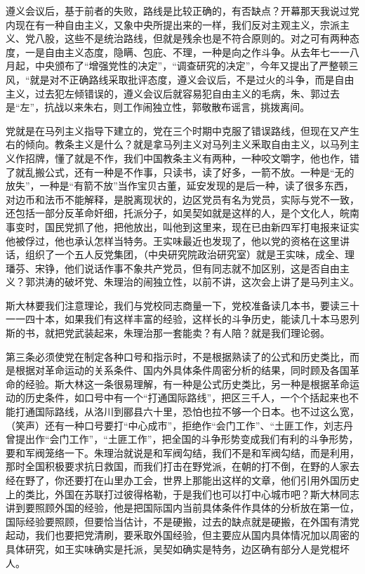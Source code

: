 遵义会议后，基于前者的失败，路线是比较正确的，有否缺点？开幕那天我说过党内现在有一种自由主义，又象中央所提出来的一样，我们反对主观主义，宗派主义、党八股，这些不是统治路线，但就是残余也是不符合原则的。对之可有两种态度，一是自由主义态度，隐瞒、包庇、不理，一种是向之作斗争。从去年七一一八月起，中央颁布了“增强党性的决定”，“调查研究的决定”，今年又提出了严整顿三风，“就是对不正确路线采取批评态度，遵义会议后，不是过火的斗争，而是自由主义，过去犯左倾错误的，遵义会议后就容易犯自由主义的毛病，朱、郭过去是“左”，抗战以来朱右，则工作闹独立性，郭敬散布谣言，挑拨离间。

党就是在马列主义指导下建立的，党在三个时期中克服了错误路线，但现在又产生右的倾向。教条主义是什么？就是拿马列主义对马列主义釆取自由主义，以马列主义作招牌，懂了就是不作，我们中国教条主义有两种，一种咬文嚼字，他也作，错了就乱搬公式，还有一种是不作事，只读书，读了好多，一箭不放。一种是“无的放失”，一种是“有箭不放”当作宝贝古董，延安发现的是后一种，读了很多东西，对边币和法币不能解释，是脱离现状的，边区党员有名为党员，实际与党不一致，还包括一部分反革命奸细，托派分子，如吴契如就是这样的人，是个文化人，皖南事变时，国民党抓了他，把他放出，叫他到这里来，现在已由新四军打电报来证实他被俘过，他也承认怎样当特务。王实味最近也发现了，他以党的资格在这里讲话，组织了一个五人反党集团，（中央研究院政治研究室）就是王实味，成全、理璠芬、宋铮，他们说话作事不象共产党员，但有同志就不加区别，这是否自由主义？郭洪涛的破坏党、朱理治的闹独立性，以前不讲，这次会上讲了是马列主义。

斯大林要我们注意理论，我们与党校同志商量一下，党校准备读几本书，要读三十一一四十本，如果我们有这样丰富的经验，这样长的斗争历史，能读几十本马恩列斯的书，就把党武装起来，朱理治那一套能卖？有人陪？就是我们理论弱。

第三条必须使党在制定各种口号和指示时，不是根据熟读了的公式和历史类比，而是根据对革命运动的关系条件、国内外具体条件周密分析的结果，同时顾及各国革命的经验。斯大林这一条很易理解，有一种是公式历史类比，另一种是根据革命运动的历史条件，如口号中有一个“打通国际路线”，把区三千人，一个个括起来也不能打通国际路线，从洛川到郦县六十里，恐怕也拉不够一个日本。也不过这么宽，（笑声）还有一种口号要打“中心成市”，拒绝作“会门工作”、“土匪工作，刘志丹曾提出作“会门工作”，“土匪工作”，把全国的斗争形势变成我们有利的斗争形势，要和军阀笼络一下。朱理治就说是和军阀勾结，我们不是和军阀勾结，而是利用，那时全国积极要求抗日救国，而我们打击在野党派，在朝的打不倒，在野的人家去经在野了，你还要打在山里办工会，世界上那能出这样的文章，他们引用外国历史上的类比，外国在苏联打过彼得格勒，于是我们也可以打中心城市吧？斯大林同志讲到要照顾外国的经验，他是把国际国内当前具体条件作具体的分析放在第一位，国际经验要照顾，但要恰当估计，不是硬搬，过去的缺点就是硬搬，在外国有清党起动，我们也要把党清刷，要釆取外国经验，但主要应从国内具体情况加以周密的具体研究，如王实味确实是托派，吴契如确实是特务，边区确有部分人是党棍坏人。

